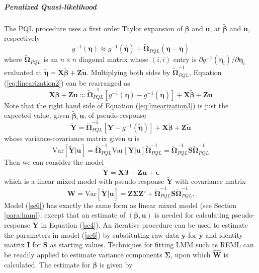 		\subparagraph*{Penalized Quasi-likelihood}
		The PQL procedure uses a first order Taylor expansion of $\bm \beta$ and $\bm u$, at $\tilde{\bm \beta} $ and $ \tilde{\bm u} $, respectively
		\begin{equation}\label{eq:linearization2}
		g^{-1}(\bm\eta) \approx g^{-1}(\hat{\bm \eta}) + \tilde{\bm \Omega}_{PQL}(\bm \eta-\tilde{\bm \eta})
		\end{equation} 
		where $\tilde{\bm \Omega}_{PQL}$ is an $n\times n$ diagonal matrix whose $(i, i)$ entry is  $\partial {g^{-1}(\bm \eta_i)}/\partial \bm \eta_i $ evaluated at $\tilde{\bm \eta}= \bm X\tilde{\bm \beta} + \bm Z\tilde{\bm u}$. Multiplying both sides by $\bm \tilde{\bm\Omega}_{PQL}^{-1}$, Equation (\ref{eq:linearization2}) can be rearranged as 
		\begin{equation}\label{eq:linearization3}
		\bm {X\beta} + \bm {Zu} \approx \tilde{\bm \Omega}_{PQL}^{-1}[g^{-1}(\bm\eta)- g^{-1}(\tilde{\bm \eta})]  + \bm{X}\tilde{\bm \beta} + \bm Z\tilde{\bm u}
		\end{equation}
		Note that the right hand side of Equation (\ref{eq:linearization3}) is just the expected value, given $\tilde{\bm \beta}, \tilde{\bm u}$, of	 pseudo-response 
		\begin{equation}\label{se4}
		\tilde{\bm Y }=\tilde{\bm \Omega}_{PQL}^{-1}[\bm Y- g^{-1}(\tilde{\bm \eta})]  + \bm{X}\tilde{\bm \beta} + \bm Z\tilde{\bm u}
		\end{equation}
		whose variance-covariance matrix given $\bm u$ is 
		\begin{equation}\label{se5}
		\text{Var}[\tilde{\bm Y }|\bm u] =\tilde{\bm \Omega}_{PQL}^{-1} \text{Var}[\bm Y|\bm u]\tilde{\bm \Omega}_{PQL}^{-1} = 
		\tilde{\bm \Omega}_{PQL}^{-1} \bm S \tilde{\bm \Omega}_{PQL}^{-1}
		\end{equation}
		Then we can consider the model 
		\begin{equation}\label{se6}
		\tilde{\bm Y } = \bm{X\beta} + \bm {Zu}  + \bm \epsilon
		\end{equation}
		which is a linear mixed model with pseudo response $\tilde{\bm Y }$ with covariance matrix 
		\begin{equation}
		\bm W = \text{Var}[ \tilde{\bm Y } |\bm u] = \bm{Z\Sigma Z'} + \tilde{\bm \Omega}_{PQL}^{-1} \bm S \tilde{\bm \Omega}_{PQL}^{-1}.
		\end{equation}
		Model (\ref{se6})  has exactly the same form as linear mixed model (see Section \ref{para:lmm}), except that an estimate of $(\bm\beta, \bm u)$  is needed for calculating pseudo-response $\tilde{\bm Y }$ in Equation (\ref{se4}). An iterative procedure can be used to estimate the parameters in model (\ref{se6}) by substituting raw data $\bm y$ for $\tilde{\bm y}$  and identity matrix $\bm I$ for $\bm S$ as starting values. Techniques for fitting LMM such as REML can be readily applied to estimate variance components $\bm \Sigma$, upon which $\hat{\bm W}$ is calculated. The estimate for $\bm \beta$ is given by
